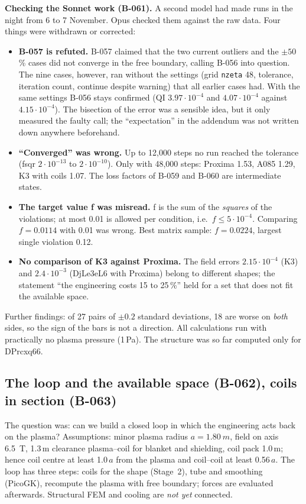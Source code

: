 \textbf{Checking the Sonnet work (B-061).} A second model had made runs in the night from 6 to 7 November. Opus checked them against the raw data. Four things were withdrawn or corrected:
\begin{itemize}\itemsep1pt
\item \textbf{B-057 is refuted.} B-057 claimed that the two current outliers and the $\pm50$\,\% cases did not converge in the free boundary, calling B-056 into question. The nine cases, however, ran without the settings
(grid \texttt{nzeta} 48, tolerance, iteration count, continue despite warning) that all earlier cases had. With the same settings B-056 stays confirmed (QI $3.97\cdot10^{-4}$ and $4.07\cdot10^{-4}$ against $4.15\cdot10^{-4}$). The
bisection of the error was a sensible idea, but it only measured the faulty call; the ``expectation'' in the addendum was not written down anywhere beforehand.
\item \textbf{``Converged'' was wrong.} Up to 12,000 steps no run reached the tolerance (fsqr $2\cdot10^{-13}$ to $2\cdot10^{-10}$). Only with 48,000 steps: Proxima 1.53, A085 1.29, K3 with coils 1.07. The loss factors of B-059 and B-060 are
intermediate states.
\item \textbf{The target value f was misread.} f is the sum of the \emph{squares} of the violations; at most 0.01 is allowed per condition, i.e.\ $f\le5\cdot10^{-4}$. Comparing $f=0.0114$ with 0.01 was wrong. Best matrix sample: $f=0.0224$, largest single violation 0.12.
\item \textbf{No comparison of K3 against Proxima.} The field errors $2.15\cdot10^{-4}$ (K3) and $2.4\cdot10^{-3}$ (DjLe3eL6 with Proxima) belong to different shapes; the statement ``the engineering costs 15 to 25\,\%'' held for a set that does not fit the available space.
\end{itemize}
Further findings: of 27 pairs of $\pm0.2$ standard deviations, 18 are worse on \emph{both} sides, so the sign of the bars is not a direction. All calculations run with practically no plasma pressure (1\,Pa). The structure was so far computed only for DPrcxq66.

\subsection{The loop and the available space (B-062), coils in section (B-063)}
The question was: can we build a closed loop in which the engineering acts back on the plasma? Assumptions: minor plasma radius $a=\SI{1.80}{m}$, field on axis \SI{6.5}{T}, 1.3\,m clearance plasma--coil for blanket and shielding, coil pack 1.0\,m;
hence coil centre at least 1.0\,$a$ from the plasma and coil--coil at least 0.56\,$a$. The loop has three steps: coils for the shape (Stage~2), tube and smoothing (PicoGK), recompute the plasma with free boundary; forces are evaluated afterwards.
Structural FEM and cooling are \emph{not yet} connected.

